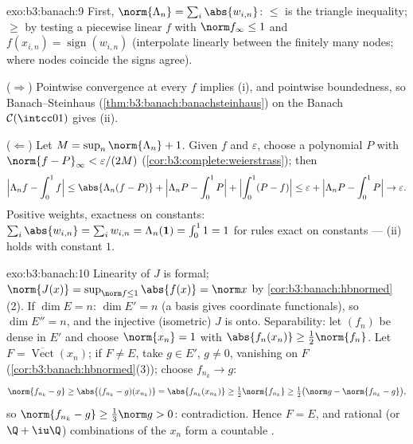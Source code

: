 \begin{solution}{exo:b3:banach:9}
First, $\norm{\Lambda_n} = \sum_i\abs{w_{i,n}}$: $\leq$ is the
triangle inequality; $\geq$ by testing a piecewise linear $f$
with $\norm f_\infty \leq 1$ and $f(x_{i,n}) =
\operatorname{sign}(w_{i,n})$ (interpolate linearly between the
finitely many nodes; where nodes coincide the signs agree).

($\Rightarrow$) Pointwise convergence at every $f$ implies (i),
and pointwise boundedness, so Banach--Steinhaus
(\cref{thm:b3:banach:banachsteinhaus}) on the Banach $\mathcal
C(\intcc01)$ gives (ii).

($\Leftarrow$) Let $M = \sup_n\norm{\Lambda_n} + 1$. Given $f$
and $\varepsilon$, choose a polynomial $P$ with $\norm{f -
P}_\infty < \varepsilon/(2M)$
(\cref{cor:b3:complete:weierstrass}); then
\[
\Bigl|\Lambda_n f - \int_0^1 f\Bigr|
\leq \abs{\Lambda_n(f - P)} + \Bigl|\Lambda_nP -
\int_0^1P\Bigr| + \Bigl|\int_0^1(P - f)\Bigr|
\leq \varepsilon + \Bigl|\Lambda_nP - \int_0^1P\Bigr| \to
\varepsilon .
\]
Positive weights, exactness on constants: $\sum_i\abs{w_{i,n}}
= \sum_iw_{i,n} = \Lambda_n(\mathbf 1) = \int_0^1 1 = 1$ for
rules exact on constants --- (ii) holds with constant $1$.
\end{solution}

\begin{solution}{exo:b3:banach:10}
Linearity of $J$ is formal; $\norm{J(x)} = \sup_{\norm f \leq
1}\abs{f(x)} = \norm x$ by
\cref{cor:b3:banach:hbnormed}(2). If $\dim E = n$: $\dim E' =
n$ (a basis gives coordinate functionals), so $\dim E'' = n$,
and the injective (isometric) $J$ is onto. Separability: let
$(f_n)$ be dense in $E'$ and choose $\norm{x_n} = 1$ with
$\abs{f_n(x_n)} \geq \frac12\norm{f_n}$. Let $F =
\overline{\operatorname{Vect}}(x_n)$; if $F \neq E$, take $g
\in E'$, $g \neq 0$, vanishing on $F$
(\cref{cor:b3:banach:hbnormed}(3)); choose $f_{n_k} \to g$:
\[
\norm{f_{n_k} - g} \geq \abs{(f_{n_k} - g)(x_{n_k})}
= \abs{f_{n_k}(x_{n_k})} \geq \tfrac12\norm{f_{n_k}}
\geq \tfrac12\bigl(\norm g - \norm{f_{n_k} - g}\bigr),
\]
so $\norm{f_{n_k} - g} \geq \frac13\norm g > 0$: contradiction.
Hence $F = E$, and rational (or $\Q + \iu\Q$) combinations of
the $x_n$ form a countable .
\end{solution}

